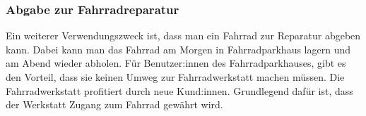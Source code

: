 \subsubsection{Abgabe zur Fahrradreparatur}
Ein weiterer Verwendungszweck ist, dass man ein Fahrrad zur Reparatur abgeben kann. Dabei kann man das Fahrrad am Morgen in Fahrradparkhaus lagern und am Abend wieder abholen. Für Benutzer:innen des Fahrradparkhauses, gibt es den Vorteil, dass sie keinen Umweg zur Fahrradwerkstatt machen müssen. Die Fahrradwerkstatt profitiert durch neue Kund:innen.
Grundlegend dafür ist, dass der Werkstatt Zugang zum Fahrrad gewährt wird.
